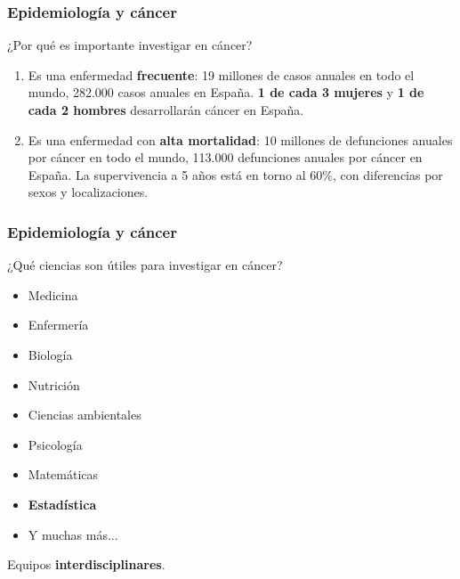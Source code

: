 \documentclass{beamer}
\begin{document}
\begin{frame}\frametitle{Epidemiología y cáncer}

\begin{block}{¿Por qué es importante investigar en cáncer?}
	\begin{enumerate}
		\item Es una enfermedad \textbf{frecuente}: 19 millones de casos anuales en todo el mundo, 282.000 casos anuales en España. \textbf{1 de cada 3 mujeres} y \textbf{1 de cada 2 hombres} desarrollarán cáncer en España.\\[2ex]
		\item Es una enfermedad con \textbf{alta mortalidad}: 10 millones de defunciones anuales por cáncer en todo el mundo, 113.000 defunciones anuales por cáncer en España. La supervivencia a 5 años está en torno al 60\%, con diferencias por sexos y localizaciones.\\[2ex]
	\end{enumerate}
\end{block}

\end{frame}




\begin{frame}\frametitle{Epidemiología y cáncer}

\begin{block}{¿Qué ciencias son útiles para investigar en cáncer?}
	\begin{itemize}
		\item Medicina
		\item Enfermería
		\item Biología
		\item Nutrición
		\item Ciencias ambientales
		\item Psicología
		\item Matemáticas
		\item \textbf{\large{Estadística}}
		\item Y muchas más...
	\end{itemize}
	
	Equipos \textbf{interdisciplinares}.
\end{block}

\end{frame}

\end{document}
